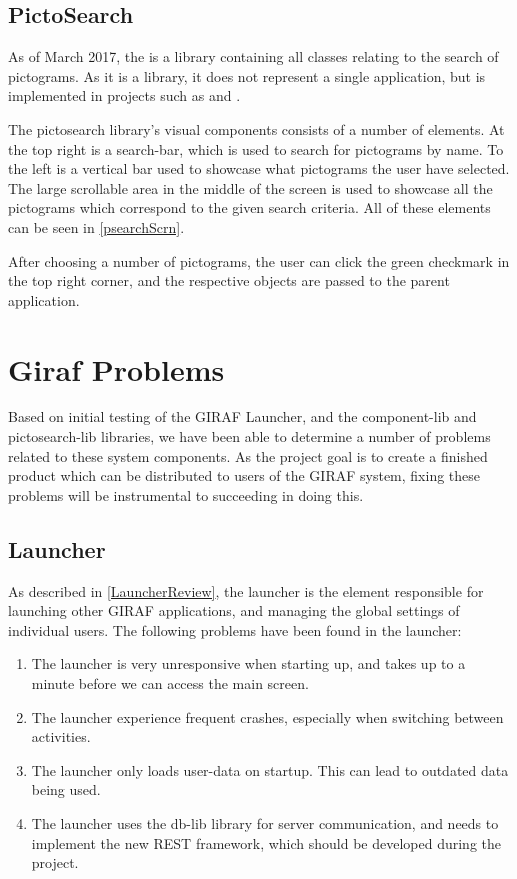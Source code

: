 \subsection{PictoSearch}\label{PictoSearchReview}
As of March 2017, the  is a library containing all
classes relating to the search of pictograms. As it is a library, it does not
represent a single application, but is implemented in projects such as
 and .\nl

The pictosearch library's visual components consists of a number of
elements. At the top right is a search-bar, which is used to search for
pictograms by name. To the left is a vertical bar used to showcase what
pictograms the user have selected. The large scrollable area in the middle of
the screen is used to showcase all the pictograms which correspond to the given
search criteria. All of these elements can be seen in
\autoref{psearchScrn}.
 

After choosing a number of pictograms, the user can click the green checkmark in
the top right corner, and the respective  objects are passed to
the parent application.

\section{Giraf Problems}
Based on initial testing of the GIRAF Launcher, and the component-lib and
pictosearch-lib libraries, we have been able to determine a number of problems
related to these system components. As the project goal is to create a finished
product which can be distributed to users of the GIRAF system, fixing these problems
will be instrumental to succeeding in doing this.

\subsection{Launcher}
As described in \autoref{LauncherReview}, the launcher is the element
responsible for launching other GIRAF applications, and managing the global
settings of individual users. The following problems have been found in the
launcher:
\begin{enumerate}
  \item The launcher is very unresponsive when starting up, and takes up to a
  minute before we can access the main screen.
  \item The launcher experience frequent crashes, especially when switching
  between activities.
  \item The launcher only loads user-data on startup. This can lead to outdated
  data being used.
  \item The launcher uses the db-lib library for server communication, and needs
  to implement the new REST framework, which should be developed during the project.
\end{enumerate}


